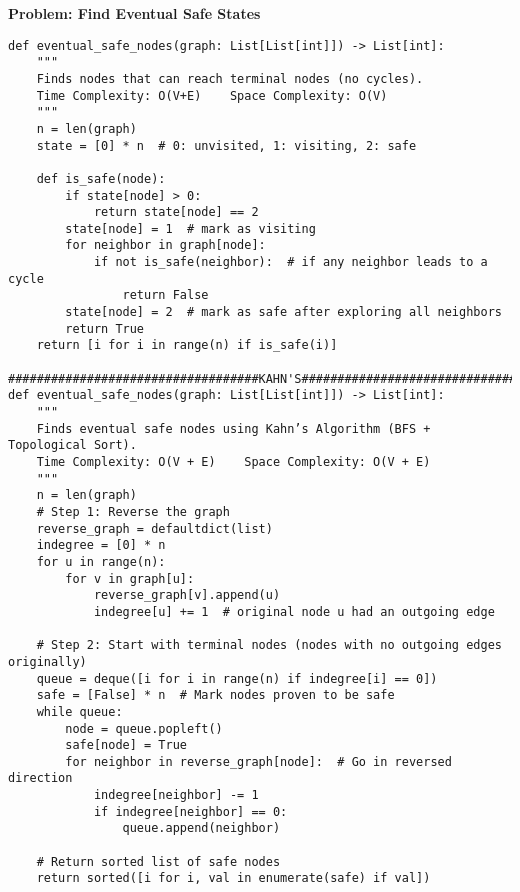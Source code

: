 \noindent\textbf{Problem: Find Eventual Safe States}
\begin{verbatim}
def eventual_safe_nodes(graph: List[List[int]]) -> List[int]:
    """
    Finds nodes that can reach terminal nodes (no cycles).
    Time Complexity: O(V+E)    Space Complexity: O(V)
    """
    n = len(graph)
    state = [0] * n  # 0: unvisited, 1: visiting, 2: safe
    
    def is_safe(node):
        if state[node] > 0:
            return state[node] == 2
        state[node] = 1  # mark as visiting
        for neighbor in graph[node]:
            if not is_safe(neighbor):  # if any neighbor leads to a cycle
                return False
        state[node] = 2  # mark as safe after exploring all neighbors
        return True
    return [i for i in range(n) if is_safe(i)]
    ###################################KAHN'S#########################################
def eventual_safe_nodes(graph: List[List[int]]) -> List[int]:
    """
    Finds eventual safe nodes using Kahn’s Algorithm (BFS + Topological Sort).
    Time Complexity: O(V + E)    Space Complexity: O(V + E)
    """
    n = len(graph)
    # Step 1: Reverse the graph
    reverse_graph = defaultdict(list)
    indegree = [0] * n
    for u in range(n):
        for v in graph[u]:
            reverse_graph[v].append(u)
            indegree[u] += 1  # original node u had an outgoing edge

    # Step 2: Start with terminal nodes (nodes with no outgoing edges originally)
    queue = deque([i for i in range(n) if indegree[i] == 0])
    safe = [False] * n  # Mark nodes proven to be safe
    while queue:
        node = queue.popleft()
        safe[node] = True
        for neighbor in reverse_graph[node]:  # Go in reversed direction
            indegree[neighbor] -= 1
            if indegree[neighbor] == 0:
                queue.append(neighbor)

    # Return sorted list of safe nodes
    return sorted([i for i, val in enumerate(safe) if val])

\end{verbatim}

